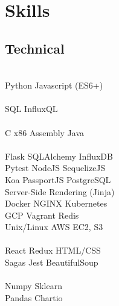 \documentclass[]{deedy-resume-openfont}
\begin{document}
\begin{minipage}[t]{0.31\textwidth}
\section{Skills}
\subsection{Technical}
\\[1\baselineskip]

Python \textbullet{} Javascript (ES6+) \\
\\[1\baselineskip]

SQL \textbullet{} InfluxQL \\
\\[1\baselineskip]

 C \textbullet{} x86 Assembly \textbullet{} Java\\
\\[1\baselineskip]

Flask \textbullet{} SQLAlchemy \textbullet{} InfluxDB \\
Pytest \textbullet{} NodeJS \textbullet{} SequelizeJS   \\
Koa \textbullet{} PassportJS \textbullet{} PostgreSQL\\
Server-Side Rendering (Jinja)
\\[1\baselineskip]

Docker \textbullet{} NGINX \textbullet{} Kubernetes \\
GCP \textbullet{} Vagrant \textbullet{} Redis\\
Unix/Linux \textbullet{} AWS EC2, S3 \\
\\[1\baselineskip]

React \textbullet{} Redux \textbullet{} HTML/CSS \\
Sagas \textbullet{} Jest \textbullet{} BeautifulSoup \\
\\[1\baselineskip]

Numpy \textbullet{} Sklearn \\
Pandas \textbullet{} Chartio
\\[1\baselineskip]

\\[1\baselineskip]


\end{minipage}
\end{document}
